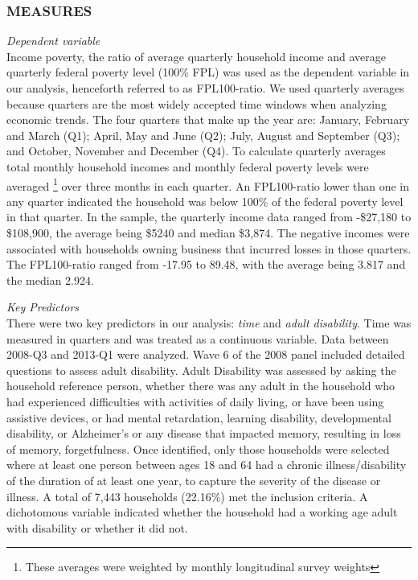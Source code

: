 \documentclass[11pt]{extarticle} %
\begin{document}
\subsubsection*{MEASURES}
\noindent
{\emph{Dependent variable}}\\
Income poverty, the ratio of average quarterly household income and average quarterly federal poverty level (100\% FPL) was used as the dependent variable in our analysis, henceforth referred to as FPL100-ratio. We used quarterly averages because quarters are the most widely accepted time windows when analyzing economic trends. The four quarters that make up the year are: January, February and March (Q1); April, May and June (Q2); July, August and September (Q3); and October, November and December (Q4). To calculate quarterly averages total monthly household incomes and monthly federal poverty levels were averaged \footnote{These averages were weighted by monthly longitudinal survey weights} over three months in each quarter. An FPL100-ratio lower than one in any quarter indicated the household was below 100\% of the federal poverty level in that quarter. In the sample, the quarterly income data ranged from -\$27,180 to \$108,900, the average being \$5240 and median \$3,874. The negative incomes were associated with households owning business that incurred losses in those quarters. The FPL100-ratio ranged from -17.95 to 89.48, with the average being 3.817 and the median 2.924. 

\noindent
{\emph{Key Predictors}}\\
There were two key predictors in our analysis: {\emph{time}} and {\emph{adult disability}}. Time was measured in quarters and was treated as a continuous variable. Data between 2008-Q3 and 2013-Q1 were analyzed. Wave 6 of the 2008 panel included detailed questions to assess adult disability. Adult Disability was assessed by asking the household reference person, whether there was any adult in the household who had experienced difficulties with activities of daily living, or have been using assistive devices, or had mental retardation, learning disability, developmental disability, or Alzheimer's or any disease that impacted memory, resulting in loss of memory, forgetfulness. Once identified, only those households were selected where at least one person between ages 18 and 64  had a chronic illness/disability of the duration of at least one year, to capture the severity of the disease or illness. A total of 7,443 households (22.16\%) met the inclusion criteria. A dichotomous variable indicated whether the household had a working age adult with disability or whether it did not. 
\end{document}
